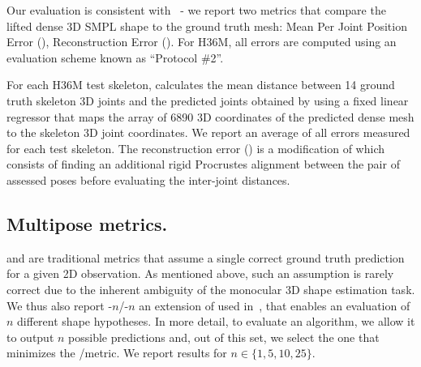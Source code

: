 Our evaluation is consistent with~\cite{kolotouros19learning,kolotouros19convolutional} - we report two metrics that compare the lifted dense 3D SMPL shape to the ground truth mesh: Mean Per Joint Position Error (\textbf{\MPJPE}), Reconstruction Error (\textbf{\RE}). 
For H36M, all errors are computed using an evaluation scheme known as ``Protocol \#2''. 

For each H36M test skeleton, \MPJPE calculates the mean distance between 14 ground truth skeleton 3D joints and the predicted joints obtained by using a fixed linear regressor that maps the array of 6890 3D coordinates of the predicted dense mesh to the skeleton 3D joint coordinates.
We report an average of all \MPJPE errors measured for each test skeleton.
The reconstruction error (\RE) is a modification of \MPJPE which consists of finding an additional rigid Procrustes alignment between the pair of assessed poses before evaluating the inter-joint distances.






\subsection{Multipose metrics.}

\MPJPE and \RE are traditional metrics that assume a single correct ground truth prediction for a given 2D observation.
As mentioned above, such an assumption is rarely correct due to the inherent ambiguity of the monocular 3D shape estimation task.
We thus also report \MPJPE-$n$/\RE-$n$ an extension of \MPJPE\RE used in~\cite{li19generating}, that enables an evaluation of $n$ different shape hypotheses.
In more detail, to evaluate an algorithm, we allow it to output $n$ possible predictions and, out of this set, we select the one that minimizes the \MPJPE/\RE metric.
We report results for $n\in \{1,5,10,25\}$.


